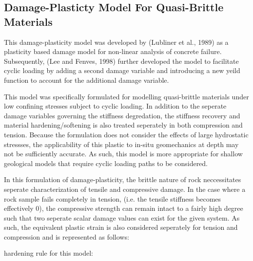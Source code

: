 \subsection{Damage-Plasticty Model For Quasi-Brittle Materials}

This damage-plasticity model was developed by (Lubliner et al., 1989)
as a plasticity based damage model for non-linear analysis of concrete
failure. Subsequently, (Lee and Fenves, 1998) further developed the
model to facilitate cyclic loading by adding a second damage variable
and introducing a new yeild function to account for the additional
damage variable. 

This model was specifically formulated for modelling quasi-brittle
materials under low confining stresses subject to cyclic loading.
In addition to the seperate damage variables governing the stiffness
degredation, the stiffness recovery and material hardening/softening
is also treated seperately in both compression and tension. Because
the formulation does not consider the effects of large hydrostatic
stressses, the applicability of this plastic to in-situ geomechanics
at depth may not be sufficiently accurate. As such, this model is
more appropriate for shallow geological models that require cyclic
loading paths to be considered. 

In this formulation of damage-plasticity, the brittle nature of rock
neccessitates seperate characterization of tensile and compressive
damage. In the case where a rock sample fails completely in tension,
(i.e. the tensile stiffness becomes effectively 0), the compressive
strength can remain intact to a fairly high degree such that two seperate
scalar damage values can exist for the given system. As such, the
equivalent plastic strain is also considered seperately for tension
and compression and is represented as follows: 


hardening rule for this model:



